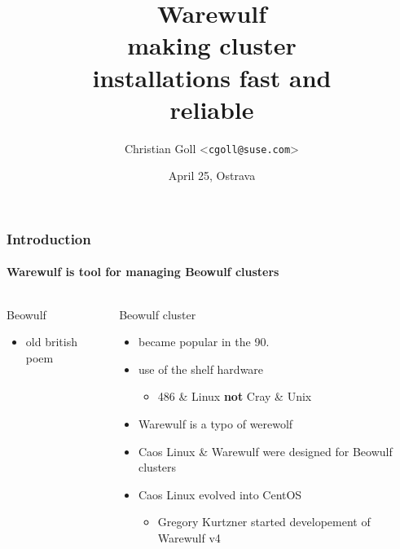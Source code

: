 \documentclass[aspectratio=169]{beamer}
\title{Warewulf\\
making cluster\\
installations fast and \\
reliable}
\date{April 25, Ostrava}
\author{Christian Goll <\texttt{cgoll@suse.com}>}
\begin{document}
\begin{frame}
\titlepage
\end{frame}
\begin{frame}[fragile]
\frametitle{Introduction}
\framesubtitle{Warewulf is tool for managing Beowulf clusters}
\begin{columns}
\begin{block}{Beowulf}
  \begin{itemize}
    \item old british poem
  \end{itemize}
\end{block}
\begin{block}{Beowulf cluster}
  \begin{itemize}
    \item became popular in the 90.
    \item use of the shelf hardware
    \begin{itemize}
      \item 486 \& Linux \textbf{not} Cray \& Unix
    \end{itemize}
    \item Warewulf is a typo of werewolf
    \item Caos Linux \& Warewulf were designed for Beowulf clusters
    \item Caos Linux evolved into CentOS
    \begin{itemize}
      \item Gregory Kurtzner started developement of Warewulf v4
    \end{itemize}
  \end{itemize}
\end{block}

\end{columns}
\end{frame}
\end{document}
